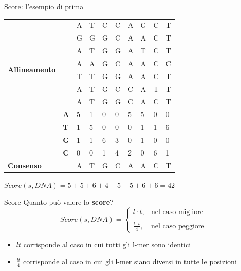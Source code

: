 	\begin{frame}{Score: l'esempio di prima}
		\begin{center}
			\begin{tabular}{l l l l l l l l l l}
				\multirow{8}{*}{\textbf{Allineamento}} & & A & T & C & C & A & G & C & T\\
				& & G & G & G & C & A & A & C & T\\
				& & A & T & G & G & A & T & C & T\\
				& & A & A & G & C & A & A & C & C\\
				& & T & T & G & G & A & A & C & T\\
				& & A & T & G & C & C & A & T & T\\
				& & A & T & G & G & C & A & C & T\\
				\hline
				\multirow{4}{*}{\textbf{Profilo}} & \textbf{A} & 5 & 1 & 0 & 0 & 5 & 5 & 0 & 0\\
				& \textbf{T} & 1 & 5 & 0 & 0 & 0 & 1 & 1 & 6\\
				& \textbf{G} & 1 & 1 & 6 & 3 & 0 & 1 & 0 & 0\\
				& \textbf{C} & 0 & 0 & 1 & 4 & 2 & 0 & 6 & 1\\
				\hline
				\textbf{Consenso} & & A & T & G & C & A & A & C & T 
			\end{tabular}
		\end{center}
	\pause	$Score(s,DNA) = 5+5+6+4+5+5+6+6=42$
	\end{frame}
	
	\begin{frame}{Score}
		Quanto può valere lo \alert{\textbf{score}}?
		\pause
		\begin{equation*}
			Score(s,DNA) = \begin{cases}
				l\cdot t, & \mbox{nel caso migliore}\\
				\\
				\frac{l\cdot t}{4}, & \mbox{nel caso peggiore}
			\end{cases}
		\end{equation*}
		\begin{flushleft}
		\end{flushleft}
		\pause
		\begin{itemize}
			\item $lt$ corrisponde al caso in cui tutti gli l-mer sono identici
			\item $\frac{lt}{4}$ corrisponde al caso in cui gli l-mer siano diversi in tutte le posizioni
		\end{itemize}
	\end{frame}
	
